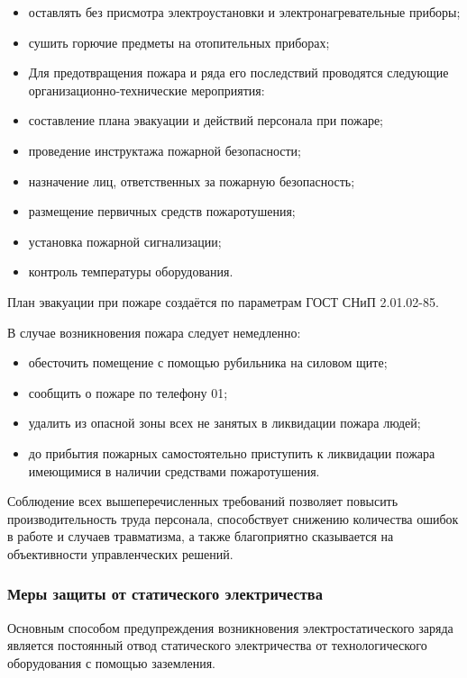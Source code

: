 \begin{itemize}
 \item оставлять без присмотра электроустановки и электронагревательные приборы;
 \item сушить горючие предметы на отопительных приборах;
 \item Для предотвращения пожара и ряда его последствий проводятся следующие организационно-технические мероприятия:
 \item составление плана эвакуации и действий персонала при пожаре;
 \item проведение инструктажа пожарной безопасности;
 \item назначение лиц, ответственных за пожарную безопасность;
 \item размещение первичных средств пожаротушения;
 \item установка пожарной сигнализации;
 \item контроль температуры оборудования.
\end{itemize}

План эвакуации при пожаре создаётся по параметрам ГОСТ СНиП 2.01.02-85.

В случае возникновения пожара следует немедленно:

\begin{itemize}
 \item обесточить помещение с помощью рубильника на силовом щите;
 \item сообщить о пожаре по телефону 01;
 \item удалить из опасной зоны всех не занятых в ликвидации пожара людей;
 \item до прибытия пожарных самостоятельно приступить к ликвидации пожара имеющимися в наличии средствами пожаротушения.
\end{itemize}

Соблюдение всех вышеперечисленных требований позволяет повысить производительность труда персонала, способствует снижению количества ошибок в работе и случаев травматизма, а также благоприятно сказывается на объективности управленческих решений.

\subsubsection{Меры защиты от статического электричества}

Основным способом предупреждения возникновения электростатического заряда является постоянный отвод статического электричества от технологического оборудования с помощью заземления. 

